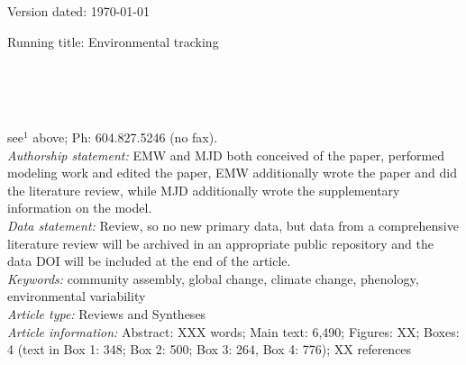 \documentclass[11pt,letterpaper]{article}
\begin{document}
\begin{flushright}
Version dated: \today
\end{flushright}
\bigskip
\noindent Running title: Environmental tracking 
\bigskip
\medskip
\begin{center}
\\
\bigskip
{}\\
\\
\medskip
\end{center}
 see$^{1}$ above; Ph: 604.827.5246 (no fax).\\

\noindent \emph{Authorship statement:} EMW and MJD both conceived of the paper, performed modeling work and edited the paper, EMW additionally wrote the paper and did the literature review, while MJD additionally wrote the supplementary information on the model.  \\
\noindent \emph{Data statement:} Review, so no new primary data, but data from a comprehensive literature review will be archived in an appropriate public repository and the data DOI will be included at the end of the article. \\
\noindent \emph{Keywords:} community assembly, global change, climate change, phenology, environmental variability\\
\noindent \emph{Article type:} Reviews and Syntheses\\
\noindent \emph{Article information:} Abstract: XXX words; Main text: 6,490; Figures: XX; Boxes: 4 (text in Box 1: 348; Box 2: 500; Box 3: 264, Box 4: 776); XX references
\newpage
\end{document}
